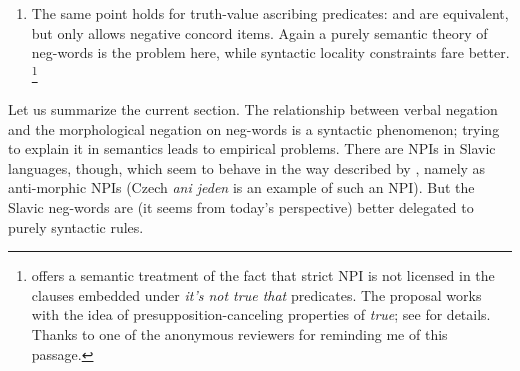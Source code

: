 \documentclass[output=paper,colorlinks,citecolor=brown]{langscibook}
\begin{document}
\begin{enumerate}
{\noindent I'm not sure whether his argument is very strong since the predicate logic implication $\neg\forall x(Px \wedge Qx) \rightarrow (\neg\forall xPx \vee \neg\forall xQx)$ is valid. 
Recent work on necessity modals \citep{agha2022weak} opens up a possibility to formalize certain necessity modals not as universal quantifiers. Going in this direction would weaken Gajewski's argument even more. Nevertheless, following this route of argumentation would be intriguing but would lead us too far away from the merit of the current chapter.
}
\item
  The same point holds for truth-value ascribing predicates:  and  are equivalent, but only  allows negative concord items. Again a purely semantic theory of neg-words is the problem here, while syntactic locality constraints fare better.%
\footnote{\citet[Appendix to Sect. 2]{gajewski_neg-raising_2007} offers a semantic treatment of the fact that strict NPI is not licensed in the clauses embedded under \textit{it's not true that} predicates. The proposal works with the idea of presupposition-canceling properties of \textit{true}; see \citet[308--310]{gajewski_neg-raising_2007} for details. Thanks to one of the anonymous reviewers for reminding me of this passage.}
\end{enumerate}

\ea{}
\z
\z

\noindent Let us summarize the current section. The relationship between verbal negation and the morphological negation on neg-words is a syntactic phenomenon; trying to explain it in semantics leads to empirical problems. There are NPIs in Slavic languages, though, which seem to behave in the way described by \citet{Blaszczak2001}, namely as anti-morphic NPIs (Czech \emph{ani jeden} is an example of such an NPI). But the Slavic neg-words are (it seems from today's perspective) better delegated to purely syntactic rules.
\end{document}
